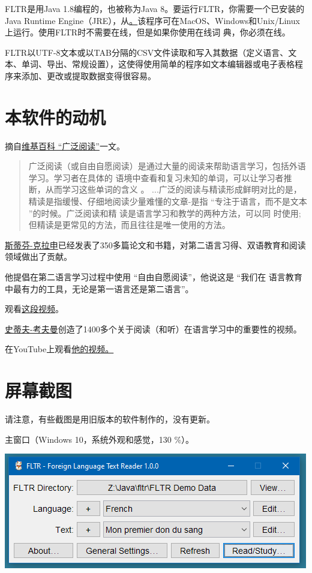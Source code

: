 \documentclass[cn,10pt,math=newtx,citestyle=gb7714-2015,bibstyle=gb7714-2015]{elegantbook}
\begin{document}
FLTR是用Java 1.8编程的，也被称为Java 8。要运行FLTR，你需要一个已安装的Java Runtime Engine（JRE），从\href{http://java.com}。该程序可在MacOS、Windows和Unix/Linux上运行。使用FLTR时不需要在线，但是如果你使用在线词 典，你必须在线。


FLTR以UTF-8文本或以TAB分隔的CSV文件读取和写入其数据（定义语言、文本、单词、导出、常规设置），这使得使用简单的程序如文本编辑器或电子表格程序来添加、更改或提取数据变得很容易。
\chapter{本软件的动机}
摘自\href{http://en.wikipedia.org/wiki/Extensive_reading}{维基百科 “广泛阅读”}一文。
\begin{quotation}

广泛阅读（或自由自愿阅读）是通过大量的阅读来帮助语言学习，包括外语学习。学习者在具体的 语境中查看和复习未知的单词，可以让学习者推断，从而学习这些单词的含义 。 ...广泛的阅读与精读形成鲜明对比的是，精读是指缓慢、仔细地阅读少量难懂的文章-是指 “专注于语言，而不是文本 ”的时候。广泛阅读和精 读是语言学习和教学的两种方法，可以同 时使用;但精读是更常见的方法，而且往往是唯一使用的方法。
\end{quotation}
\href{https://zh.wikipedia.org/zh-hans/史蒂芬·克拉申}{斯蒂芬-克拉申}已经发表了350多篇论文和书籍，对第二语言习得、双语教育和阅读领域做出了贡献。


他提倡在第二语言学习过程中使用 “自由自愿阅读”，他说这是 “我们在 语言教育中最有力的工具，无论是第一语言还是第二语言”。


观看\href{http://www.youtube.com/watch?v=NiTsduRreug}{这段视频}。


\href{https://blog.thelinguist.com/}{史蒂夫-考夫曼}创造了1400多个关于阅读（和听）在语言学习中的重要性的视频。

在YouTube上观看\href{https://www.youtube.com/user/lingosteve/videos?sort=p&flow=grid&view=0}{他的视频。}
\chapter{屏幕截图}

请注意，有些截图是用旧版本的软件制作的，没有更新。


主窗口（Windows 10，系统外观和感觉，130 \%）。

\includegraphics[scale=0.8]{image/images-006.png}
\end{document}
